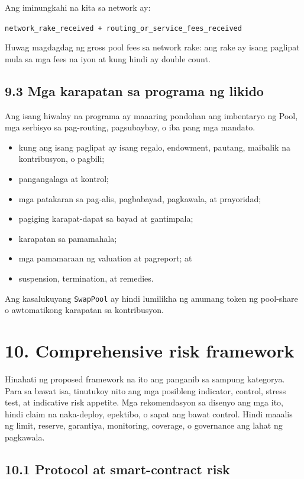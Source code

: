 \documentclass[11pt]{article}
\begin{document}
Ang iminungkahi na kita sa network ay:

\texttt{network\_rake\_received + routing\_or\_service\_fees\_received}

Huwag magdagdag ng gross pool fees sa network rake: ang rake ay isang paglipat mula sa mga fees na iyon at kung hindi ay double count.

\subsection*{9.3 Mga karapatan sa programa ng likido}

Ang isang hiwalay na programa ay maaaring pondohan ang imbentaryo ng Pool, mga serbisyo sa pag-routing, pagsubaybay, o iba pang mga mandato.

\begin{itemize}[leftmargin=*]
\item kung ang isang paglipat ay isang regalo, endowment, pautang, maibalik na kontribusyon, o pagbili;
\item pangangalaga at kontrol;
\item mga patakaran sa pag-alis, pagbabayad, pagkawala, at prayoridad;
\item pagiging karapat-dapat sa bayad at gantimpala;
\item karapatan sa pamamahala;
\item mga pamamaraan ng valuation at pagreport; at
\item suspension, termination, at remedies.
\end{itemize}
Ang kasalukuyang \texttt{SwapPool} ay hindi lumilikha ng anumang token ng pool-share o awtomatikong karapatan sa kontribusyon.


\section*{10. Comprehensive risk framework}

Hinahati ng proposed framework na ito ang panganib sa sampung kategorya. Para sa bawat isa, tinutukoy nito ang mga posibleng indicator, control, stress test, at indicative risk appetite. Mga rekomendasyon sa disenyo ang mga ito, hindi claim na naka-deploy, epektibo, o sapat ang bawat control. Hindi maaalis ng limit, reserve, garantiya, monitoring, coverage, o governance ang lahat ng pagkawala.

\subsection*{10.1 Protocol at smart-contract risk}
\end{document}
